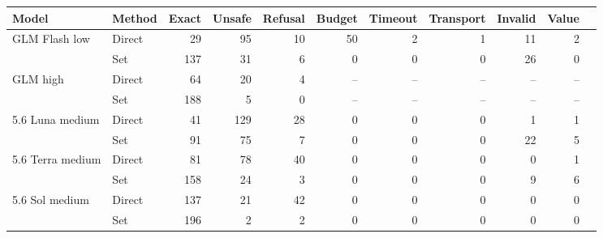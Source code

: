 \begin{tabular}{llrrrrrrrrr}
\toprule
Model & Method & Exact & Unsafe & Refusal & Budget & Timeout & Transport & Invalid & Value \\
\midrule
GLM Flash low & Direct & 29 & 95 & 10 & 50 & 2 & 1 & 11 & 2 \\
 & Set & 137 & 31 & 6 & 0 & 0 & 0 & 26 & 0 \\
\midrule
GLM high & Direct & 64 & 20 & 4 & -- & -- & -- & -- & -- \\
 & Set & 188 & 5 & 0 & -- & -- & -- & -- & -- \\
\midrule
5.6 Luna medium & Direct & 41 & 129 & 28 & 0 & 0 & 0 & 1 & 1 \\
 & Set & 91 & 75 & 7 & 0 & 0 & 0 & 22 & 5 \\
\midrule
5.6 Terra medium & Direct & 81 & 78 & 40 & 0 & 0 & 0 & 0 & 1 \\
 & Set & 158 & 24 & 3 & 0 & 0 & 0 & 9 & 6 \\
\midrule
5.6 Sol medium & Direct & 137 & 21 & 42 & 0 & 0 & 0 & 0 & 0 \\
 & Set & 196 & 2 & 2 & 0 & 0 & 0 & 0 & 0 \\
\bottomrule
\end{tabular}

